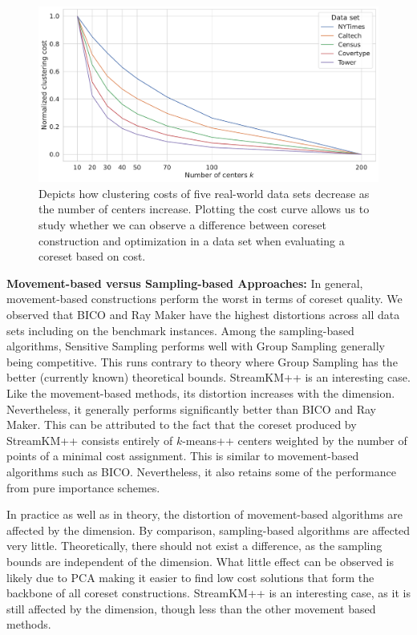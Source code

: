 \begin{figure}
  \includegraphics[width=1\linewidth]{figures/cost-curves-real-world-datasets.pdf}
  \caption{Depicts how clustering costs of five real-world data sets decrease as the number of centers increase. 
  Plotting the cost curve allows us to study whether we can observe a difference between coreset construction and optimization in a data set when evaluating a coreset based on cost.
  }
  \label{fig:cost-curves-real-world-datasets}
\end{figure}



{\bf Movement-based versus Sampling-based Approaches:}
In general, movement-based constructions perform the worst in terms of coreset quality. 
We observed that BICO and Ray Maker have the highest distortions across all data sets including on the benchmark instances. Among the sampling-based algorithms, Sensitive Sampling performs well with Group Sampling generally being competitive. This runs contrary to theory where Group Sampling has the better (currently known) theoretical bounds. StreamKM++ is an interesting case. Like the movement-based methods, its distortion increases with the dimension. Nevertheless, it generally performs significantly better than BICO and Ray Maker. This can be attributed to the fact that the coreset produced by StreamKM++ consists entirely of $k$-means++ centers weighted by the number of points of a minimal cost assignment. This is similar to movement-based algorithms such as BICO. Nevertheless, it also retains some of the performance from pure importance schemes.

In practice as well as in theory, the distortion of movement-based algorithms are affected by the dimension. By comparison, sampling-based algorithms are affected very little. Theoretically, there should not exist a difference, as the sampling bounds are independent of the dimension. What little effect can be observed is likely due to PCA making it easier to find low cost solutions that form the backbone of all coreset constructions. StreamKM++ is an interesting case, as it is still affected by the dimension, though less than the other movement based methods.

